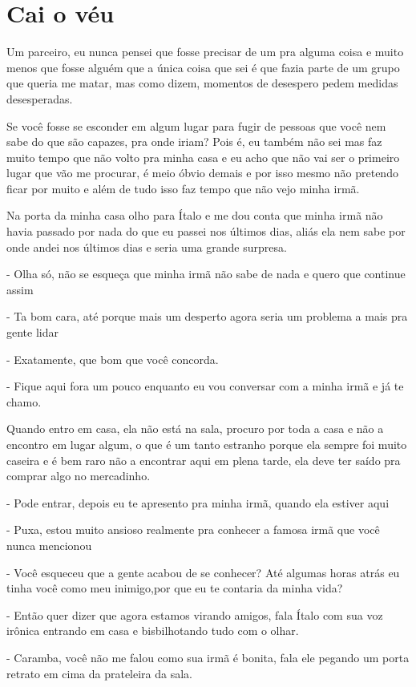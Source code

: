 \chapter{Cai o véu}
Um parceiro, eu nunca pensei que fosse precisar de um pra alguma coisa e muito menos que fosse alguém que a única coisa que sei é que fazia parte de um grupo que queria me matar, mas como dizem, momentos de desespero pedem medidas desesperadas.

Se você fosse se esconder em algum lugar para fugir de pessoas que você nem sabe do que são capazes, pra onde iriam? Pois é, eu também não sei mas faz muito tempo que não volto pra minha casa e eu acho que não vai ser o primeiro lugar que vão me procurar,  é meio óbvio demais e por isso mesmo não pretendo ficar por muito e além de tudo isso faz tempo que não vejo minha irmã.

Na porta da minha casa olho para Ítalo e me dou conta que minha irmã não havia passado por nada do que eu passei nos últimos dias, aliás ela nem sabe por onde andei nos últimos dias e seria uma grande surpresa.

- Olha só, não se esqueça que minha irmã não sabe de nada e quero que continue assim

- Ta bom cara, até porque mais um desperto agora seria um problema a mais pra gente lidar

- Exatamente, que bom que você concorda.

- Fique aqui fora um pouco enquanto eu vou conversar com a minha irmã e já te chamo.

Quando entro em casa, ela não está na sala, procuro por toda a casa e não a encontro em lugar algum, o que é um tanto estranho porque ela sempre foi muito caseira e é bem raro não a encontrar aqui em plena tarde, ela deve ter saído pra comprar algo no mercadinho.

- Pode entrar, depois eu te apresento pra minha irmã, quando ela estiver aqui

- Puxa, estou muito ansioso realmente pra conhecer a famosa irmã que você nunca mencionou

- Você esqueceu que a gente acabou de se conhecer? Até algumas horas atrás eu tinha você como meu inimigo,por que eu te contaria da minha vida?

- Então quer dizer que agora estamos virando amigos, fala Ítalo com sua voz irônica entrando em casa e bisbilhotando tudo com o olhar.

- Caramba, você não me falou como sua irmã é bonita, fala ele pegando um porta retrato em cima da prateleira da sala.

